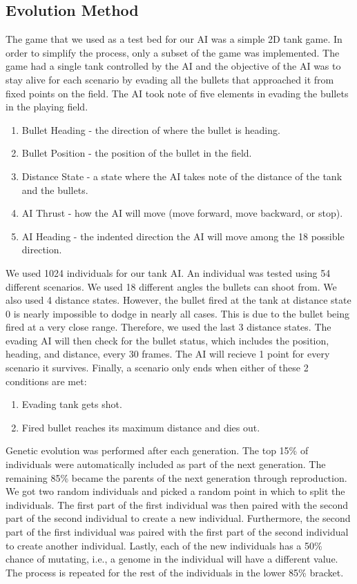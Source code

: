 \subsection{Evolution Method}
The game that we used as a test bed for our AI was a simple 2D tank game.
In order to simplify the process, only a subset of the game was implemented.
The game had a single tank controlled by the AI and the objective of the AI
was to stay alive for each scenario by evading all the bullets that approached
it from fixed points on the field. The AI took note of five elements in evading the
bullets in the playing field.

\begin{enumerate}
 \item Bullet Heading - the direction of where the bullet is heading.
 \item Bullet Position - the position of the bullet in the field.
 \item Distance State - a state where the AI takes note of the distance 
of the tank and the bullets.
 \item AI Thrust - how the AI will move (move forward, move backward, or stop).
 \item AI Heading - the indented direction the AI will move among the 18
possible direction.
\end{enumerate}

We used 1024 individuals for our tank AI. An individual was tested using 54 different
scenarios. We used 18 different angles the bullets can shoot from. We also used 4
distance states. However, the bullet fired at the tank at distance state 0 is nearly
impossible to dodge in nearly all cases. This is due to the bullet being fired at a 
very close range. Therefore, we used the last 3 distance states. The evading AI will
then check for the bullet status, which includes the position, heading, and distance,
every 30 frames. The AI will recieve 1 point for every scenario it survives. Finally,
a scenario only ends when either of these 2 conditions are met:

\begin{enumerate}
 \item Evading tank gets shot.
 \item Fired bullet reaches its maximum distance and dies out.
\end{enumerate}

Genetic evolution was performed after each generation. The top 15\% of individuals
were automatically included as part of the next generation. The remaining 85\% became
the parents of the next generation through reproduction. We got two random individuals
and picked a random point in which to split the individuals. The first part of the 
first individual was then paired with the second part of the second individual to 
create a new individual. Furthermore, the second part of the first individual was
paired with the first part of the second individual to create another individual.
Lastly, each of the new individuals has a 50\% chance of mutating, i.e., a genome
in the individual will have a different value. The process is repeated for the
rest of the individuals in the lower 85\% bracket.


